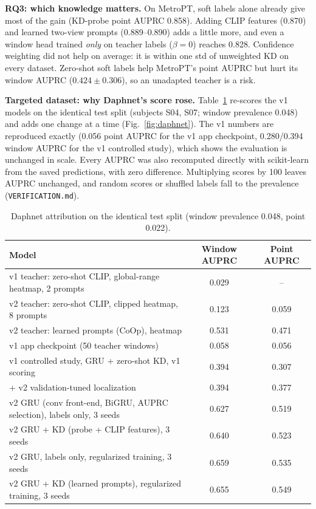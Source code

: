 \documentclass[twoside,english]{article}
\begin{document}
\textbf{RQ3: which knowledge matters.} On MetroPT, soft labels alone already give most of the gain (KD-probe point AUPRC 0.858). Adding CLIP features (0.870) and learned two-view prompts (0.889--0.890) adds a little more, and even a window head trained \emph{only} on teacher labels ($\beta=0$) reaches 0.828. Confidence weighting did not help on average: it is within one std of unweighted KD on every dataset. Zero-shot soft labels help MetroPT's point AUPRC but hurt its window AUPRC ($0.424\pm0.306$), so an unadapted teacher is a risk.

\textbf{Targeted dataset: why Daphnet's score rose.} Table~\ref{tab:ladder} re-scores the v1 models on the identical test split (subjects S04, S07; window prevalence 0.048) and adds one change at a time (Fig.~\ref{fig:daphnet}). The v1 numbers are reproduced exactly (0.056 point AUPRC for the v1 app checkpoint, 0.280/0.394 window AUPRC for the v1 controlled study), which shows the evaluation is unchanged in scale. Every AUPRC was also recomputed directly with scikit-learn from the saved predictions, with zero difference. Multiplying scores by 100 leaves AUPRC unchanged, and random scores or shuffled labels fall to the prevalence (\texttt{VERIFICATION.md}).

\begin{table}[h]
\centering\small
\caption{Daphnet attribution on the identical test split (window prevalence 0.048, point 0.022).}
\label{tab:ladder}
\begin{tabular}{lcc}
\toprule
Model & Window AUPRC & Point AUPRC \\
\midrule
v1 teacher: zero-shot CLIP, global-range heatmap, 2 prompts & 0.029 & -- \\
v2 teacher: zero-shot CLIP, clipped heatmap, 8 prompts & 0.123 & 0.059 \\
v2 teacher: learned prompts (CoOp), heatmap & 0.531 & 0.471 \\
v1 app checkpoint (50 teacher windows) & 0.058 & 0.056 \\
v1 controlled study, GRU + zero-shot KD, v1 scoring & 0.394 & 0.307 \\
\quad + v2 validation-tuned localization & 0.394 & 0.377 \\
v2 GRU (conv front-end, BiGRU, AUPRC selection), labels only, 3 seeds & 0.627 & 0.519 \\
v2 GRU + KD (probe + CLIP features), 3 seeds & 0.640 & 0.523 \\
v2 GRU, labels only, regularized training, 3 seeds & 0.659 & 0.535 \\
v2 GRU + KD (learned prompts), regularized training, 3 seeds & 0.655 & 0.549 \\
\bottomrule
\end{tabular}
\end{table}
\end{document}
